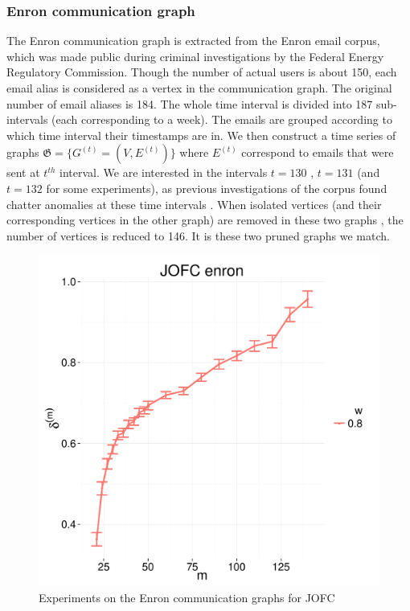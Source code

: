 \documentclass[12pt,oneside,final]{thesis}\usepackage[]{graphicx}\usepackage[]{color}
\begin{document}
\subsubsection{Enron communication graph}
The Enron communication graph is extracted from the  Enron  email corpus, which was made public during criminal investigations by the  Federal Energy Regulatory Commission. Though the number of actual users is about 150,  each email alias is considered as a vertex in the communication graph. The original number of email aliases is 184. The whole time interval is divided into 187 sub-intervals (each corresponding to a week). The emails are grouped according to which time interval their timestamps are in. We then construct a time series of graphs $\mathfrak{G}=\{G^{(t)} = (V,E^{(t)})\}$ where $E^{(t)}$ correspond to emails that were sent at $t^{th}$ interval. We are interested in the intervals $t=130$ , $t=131$ (and $t=132$ for some experiments), as previous  investigations of the corpus found chatter anomalies at these time intervals \cite{EnronStudy}. When isolated vertices (and their corresponding vertices in the other graph) are removed in these two graphs  , the number of vertices is reduced to 146. It is these two pruned graphs we match.

\begin{figure}
\includegraphics[scale=0.75]{JOFC-enron_dim_20}
\caption{Experiments on the Enron communication graphs for JOFC \label{enron_graphmatch}}
\end{figure}
\end{document}
